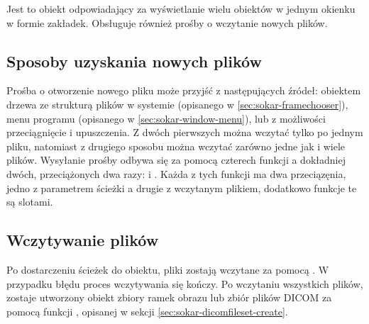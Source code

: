 \label{sec:sokar-dicomtabs}

\par
Jest to obiekt odpowiadający za wyświetlanie wielu obiektów  w jednym okienku w formie zakładek.
Obsługuje również prośby o wczytanie nowych plików.

\subsection{Sposoby uzyskania nowych plików}

\par
Prośba o otworzenie nowego pliku może przyjść z następujących źródeł: obiektem drzewa ze strukturą plików w systemie (opisanego w \ref{sec:sokar-framechooser}), menu programu (opisanego w \ref{sec:sokar-window-menu}), lub z możliwości przeciągnięcie i upuszczenia.
Z dwóch pierwszych można wczytać tylko po jednym pliku, natomiast z drugiego sposobu można wczytać zarówno jedne jak i wiele plików.
Wysyłanie prośby odbywa się za pomocą czterech funkcji a dokładniej dwóch, przeciążonych dwa razy:  i .
Każda z tych funkcji ma dwa przeciązęnia, jedno z parametrem ścieżki a drugie z wczytanym plikiem, dodatkowo funkcje te są slotami.

\subsection{Wczytywanie plików}

\par
Po dostarczeniu ścieżek do obiektu, pliki zostają wczytane za pomocą .
W przypadku błędu proces wczytywania się kończy.
Po wczytaniu wszystkich plików, zostaje utworzony obiekt zbiory ramek obrazu lub zbiór plików DICOM za pomocą funkcji , opisanej w sekcji \ref{sec:sokar-dicomfileset-create}.
